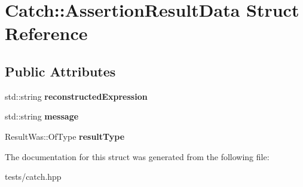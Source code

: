 \hypertarget{struct_catch_1_1_assertion_result_data}{}\section{Catch\+:\+:Assertion\+Result\+Data Struct Reference}
\label{struct_catch_1_1_assertion_result_data}
\subsection*{Public Attributes}
\begin{DoxyCompactItemize}
\item 
\mbox{\label{struct_catch_1_1_assertion_result_data_a9e809d36fffbeb1c7d0cbe7382dd9595}} 
std\+::string {\bfseries reconstructed\+Expression}
\item 
\mbox{\label{struct_catch_1_1_assertion_result_data_ac34215803c4c4a88f795879f61c1f7b4}} 
std\+::string {\bfseries message}
\item 
\mbox{\label{struct_catch_1_1_assertion_result_data_a7ceab4a7ff722aec5587e3748caf66b7}} 
Result\+Was\+::\+Of\+Type {\bfseries result\+Type}
\end{DoxyCompactItemize}


The documentation for this struct was generated from the following file\+:\begin{DoxyCompactItemize}
\item 
tests/catch.\+hpp\end{DoxyCompactItemize}
